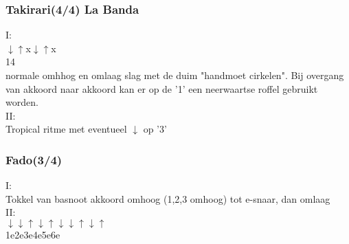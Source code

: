 \subsubsection*{Takirari(4/4) La Banda}
I:\\
$\downarrow$\hspace{1.8em}$\uparrow$\hspace{2.1em}x\hspace{2em}$\downarrow$\hspace{1.8em}$\uparrow$\hspace{2.1em}x\\
1\hspace{2em}{\footnotesize 2}\hspace{2em}{\footnotesize 3}\hspace{2em}4\hspace{2em}{\footnotesize 5}\hspace{2em}{\footnotesize 6}\\
normale omhhog en omlaag slag met de duim "handmoet cirkelen". Bij overgang van akkoord naar akkoord kan er op de '1' een neerwaartse roffel gebruikt worden.\\
II:\\
Tropical ritme met eventueel $\downarrow$ op '3'\\


\subsubsection*{Fado(3/4)}
I:\\
Tokkel van basnoot akkoord omhoog (1,2,3 omhoog) tot e-snaar, dan omlaag\\
II:\\
$\downarrow$\hspace{2em}\hphantom{$\uparrow$}\hspace{2em}$\downarrow$\hspace{2em}$\uparrow$\hspace{2.1em}$\downarrow$\hspace{2em}$\uparrow$\hspace{2.1em}$\downarrow$\hspace{2em}\hphantom{$\uparrow$}\hspace{2.1em}$\downarrow$\hspace{2em}$\uparrow$\hspace{2.1em}$\downarrow$\hspace{2em}$\uparrow$\\
1\hspace{2em}e\hspace{2em}2\hspace{2em}e\hspace{2em}3\hspace{2em}e\hspace{2em}4\hspace{2em}e\hspace{2em}5\hspace{2em}e\hspace{2em}6\hspace{2em}e\\

